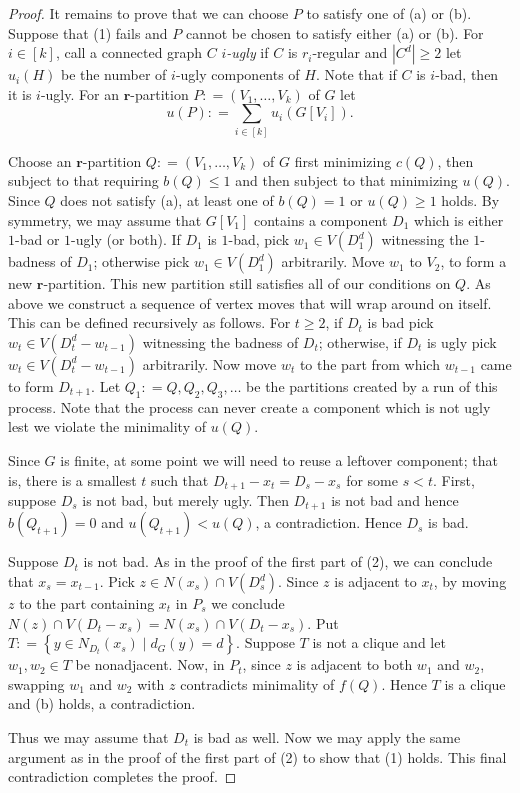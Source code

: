 \documentclass[12pt]{amsart}
\theoremstyle{plain}
\theoremstyle{definition}
\theoremstyle{remark}
\newcommand{\setb}[3]{\left\{ #1 \in #2 \mid #3 \right\}}
\newcommand{\card}[1]{\left|#1\right|}
\newcommand{\irange}[1]{\left[#1\right]}
\newcommand{\parens}[1]{\left( #1 \right)}
\newcommand{\DefinedAs}{\mathrel{\mathop:}=}
\newcommand{\mov}[2]{#1^{#2}}
\renewcommand{\vec}[1]{\mathbf{#1}}
\begin{document}
\begin{proof}
			It remains to prove that we can choose $P$ to satisfy one of (a) or (b).  Suppose that (1) fails and $P$ cannot be chosen to satisfy either (a) or (b).  For $i \in \irange{k}$, call a connected graph $C$
			\emph{$i$-ugly} if $C$ is $r_i$-regular and $\card{\mov{C}{d}} \geq 2$ let $u_i(H)$ be the number of $i$-ugly components of $H$.  Note that if $C$ is $i$-bad, then it is $i$-ugly.  For an $\vec{r}$-partition $P \DefinedAs \parens{V_1, \ldots, V_k}$ of $G$ let
\[u(P) \DefinedAs \sum_{i\in \irange{k}} u_i(G[V_i]).\]

Choose an $\vec{r}$-partition $Q \DefinedAs \parens{V_1, \ldots, V_k}$ of $G$ first minimizing $c(Q)$, then subject to that requiring $b(Q) \leq 1$ and then subject to that minimizing $u(Q)$.  Since $Q$ does not satisfy (a), at least one of $b(Q) = 1$ or $u(Q) \geq 1$ holds.  By symmetry, we may assume that $G[V_1]$ contains a component $D_1$ which is either $1$-bad or $1$-ugly (or both).  If $D_1$ is $1$-bad, pick $w_1 \in V(D_1^d)$ witnessing the $1$-badness of $D_1$; otherwise pick $w_1 \in V(D_1^d)$ arbitrarily. Move $w_1$ to $V_2$, to form a new $\vec{r}$-partition.  This new partition still satisfies all of our conditions on $Q$. As above we construct a sequence of vertex moves that will wrap around on itself. This can be defined recursively as follows.  For $t \geq 2$, if $D_t$ is bad pick $w_t \in V(D_t^d - w_{t-1})$ witnessing the badness of $D_t$; otherwise, if $D_t$ is ugly pick $w_t \in V(D_t^d - w_{t-1})$ arbitrarily.  Now move $w_t$ to the part from which $w_{t-1}$ came to form $D_{t+1}$.  Let $Q_1 \DefinedAs Q, Q_2, Q_3, \ldots$ be the partitions created by a run of this process. Note that the process can never create a component which is not ugly lest we violate the minimality of $u(Q)$.  

Since $G$ is finite, at some point we will need to reuse a leftover component; that is, 
there is a smallest $t$ such that $D_{t + 1} - x_t = D_s - x_s$ for some $s <
t$.  First, suppose $D_s$ is not bad, but merely ugly.  Then $D_{t+1}$ is not bad and hence $b(Q_{t+1}) = 0$ and $u(Q_{t+1}) < u(Q)$, a contradiction.  Hence $D_s$ is bad.  

Suppose $D_t$ is not bad.  
As in the proof of the first part of (2), we can conclude that $x_s = x_{t-1}$.  
Pick $z \in N(x_s) \cap V(\mov{D_s}{d})$. 
Since $z$ is adjacent to $x_t$, by moving $z$ to the part containing $x_t$ in $P_s$ we conclude 
$N(z) \cap V(D_t - x_s) = N(x_s) \cap V(D_t - x_s)$.  
Put $T \DefinedAs \setb{y}{N_{D_t}(x_s)}{d_G(y) = d}$. 
Suppose $T$ is not a clique and let $w_1, w_2 \in T$ be nonadjacent.  
Now, in $P_t$, since $z$ is adjacent to both $w_1$ and $w_2$, swapping $w_1$ and $w_2$ with $z$ contradicts minimality of $f(Q)$.  
Hence $T$ is a clique and (b) holds, a contradiction.

Thus we may assume that $D_t$ is bad as well.  
Now we may apply the same argument as in the proof of the first part of (2) to show that (1) holds.  This final contradiction completes the proof.
		\end{proof}
\end{document}
